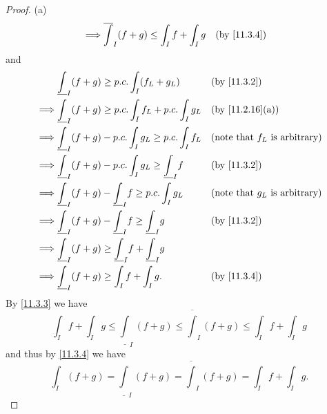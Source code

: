 \begin{proof}{(a)}
\begin{align*}
    \implies & \overline{\int}_I (f + g) \leq \int_I f + \int_I g                       &   & \by{11.3.4}
  \end{align*}
  and
  \begin{align*}
             & \underline{\int}_I (f + g) \geq p.c. \int_I (f_L + g_L)                     &   & \by{11.3.2}                             \\
    \implies & \underline{\int}_I (f + g) \geq p.c. \int_I f_L + p.c. \int_I g_L           &   & \by{11.2.16}[a]                         \\
    \implies & \underline{\int}_I (f + g) - p.c. \int_I g_L \geq p.c. \int_I f_L           &   & \text{(note that \(f_L\) is arbitrary)} \\
    \implies & \underline{\int}_I (f + g) - p.c. \int_I g_L \geq \underline{\int}_I f      &   & \by{11.3.2}                             \\
    \implies & \underline{\int}_I (f + g) - \underline{\int}_I f \geq p.c. \int_I g_L      &   & \text{(note that \(g_L\) is arbitrary)} \\
    \implies & \underline{\int}_I (f + g) - \underline{\int}_I f \geq \underline{\int}_I g &   & \by{11.3.2}                             \\
    \implies & \underline{\int}_I (f + g) \geq \underline{\int}_I f + \underline{\int}_I g &                                             \\
    \implies & \underline{\int}_I (f + g) \geq \int_I f + \int_I g.                        &   & \by{11.3.4}
  \end{align*}
  By \cref{11.3.3} we have
  \[
    \int_I f + \int_I g \leq \underline{\int}_I (f + g) \leq \overline{\int}_I (f + g) \leq \int_I f + \int_I g
  \]
  and thus by \cref{11.3.4} we have
  \[
    \int_I (f + g) = \underline{\int}_I (f + g) = \overline{\int}_I (f + g) = \int_I f + \int_I g.
  \]
\end{proof}


